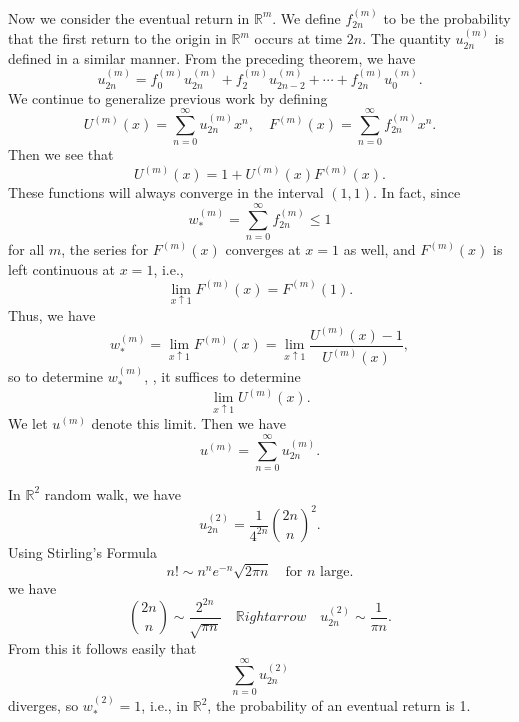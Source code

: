 Now we consider the eventual return in $\mathbb{R}^m$. We define $f_{2 n}^{(m)}$ to be the probability that the first return to the origin in $\mathbb{R}^m$ occurs at time $2n$. The quantity $u_{2 n}^{(m)}$ is defined in a similar manner. From the preceding theorem, we have 
$$\begin{equation}
    u_{2 n}^{(m)}=f_{0}^{(m)} u_{2 n}^{(m)}+f_{2}^{(m)} u_{2 n-2}^{(m)}+\cdots+f_{2 n}^{(m)} u_{0}^{(m)}.
\end{equation}$$
We continue to generalize previous work by defining
$$\begin{equation}
    U^{(m)}(x)=\sum_{n=0}^{\infty} u_{2 n}^{(m)} x^{n}, \quad F^{(m)}(x)=\sum_{n=0}^{\infty} f_{2 n}^{(m)} x^{n}.
\end{equation}$$
Then we see that 
$$\begin{equation}
    U^{(m)}(x)=1+U^{(m)}(x) F^{(m)}(x).
\end{equation}$$
These functions will always converge in the interval $(1, 1)$. In fact, since 
$$\begin{equation}
    w_{*}^{(m)}=\sum_{n=0}^{\infty} f_{2 n}^{(m)} \leq 1
\end{equation}$$
for all $m$, the series for $F^{(m)}(x)$ converges at $x = 1$ as well, and $F^{(m)}(x)$ is left continuous at $x = 1$, i.e.,
$$\begin{equation}
    \lim _{x \uparrow 1} F^{(m)}(x)=F^{(m)}(1).
\end{equation}$$
Thus, we have
$$$$$$$$\begin{equation}
    \label{eq:9.2}
    \tag{9-2}
    w_{*}^{(m)}=\lim _{x \uparrow 1} F^{(m)}(x)=\lim _{x \uparrow 1} \frac{U^{(m)}(x)-1}{U^{(m)}(x)},
\end{equation}$$$$$$$$
so to determine $w_{*}^{(m)}$, , it suffices to determine 
$$\begin{equation}
    \lim _{x \uparrow 1} U^{(m)}(x).
\end{equation}$$
We let $u^{(m)}$ denote this limit. Then we have 
$$$$$$$$\begin{equation}
    \label{eq:9.3}
    \tag{9-3}
    u^{(m)}=\sum_{n=0}^{\infty} u_{2 n}^{(m)}.
\end{equation}$$$$$$$$

In $\mathbb{R}^2$ random walk, we have
$$\begin{equation}
    u_{2 n}^{(2)}=\frac{1}{4^{2 n}} \binom{2n}{n}^2. 
\end{equation}$$
Using Stirling’s Formula
$$$$$$$$\begin{equation}
    \label{eq:Stirling}
    \tag{Stirling}
    n! \sim n^n e^{-n} \sqrt{2\pi n} \quad \text{for  $n$  large.}
\end{equation}$$$$$$$$
we have
$$\begin{equation}
    \binom{2n}{n} \sim \frac{2^{2 n}}{\sqrt{\pi n}} \quad \mathbb{R}ightarrow \quad 
    u_{2 n}^{(2)} \sim \frac{1}{\pi n}.
\end{equation}$$
From this it follows easily that 
$$\begin{equation}
    \sum_{n=0}^{\infty} u_{2 n}^{(2)}
\end{equation}$$
diverges, so $w_{*}^{(2)}=1$, i.e., in $\mathbb{R}^2$, the probability of an eventual return is 1.

